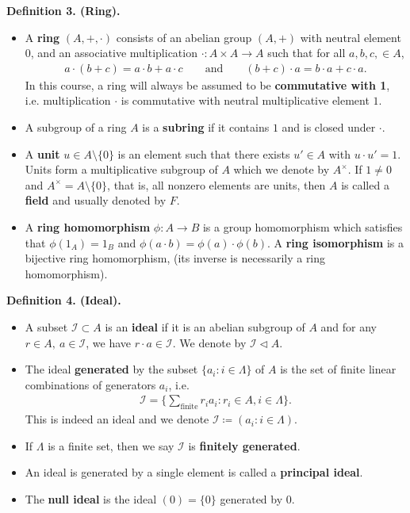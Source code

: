\documentclass[12pt,a4paper,footinclude=true,headinclude=true]{scrbook} %
\newenvironment{definition}[2][Definition]
    { \begin{mdframed}[backgroundcolor=gray!20] \textbf{#1 #2.}\ }
    {  \end{mdframed}}
\begin{document}
\begin{definition}{3. (Ring)}
    \begin{itemize}
        \item[(a)] A \textbf{ring} $(A,+,\cdot)$ consists of an abelian group $(A,+)$ with neutral element $0$, and an associative multiplication $\cdot:A\times A\to A$ such that for all $a,b,c,\in A$,
        \begin{align*}
            a\cdot(b+c)=a\cdot b+a\cdot c\qquad\text{and}\qquad (b+c)\cdot a=b\cdot a+c\cdot a.
        \end{align*}
        In this course, a ring will always be assumed to be \textbf{commutative with 1}, i.e. multiplication $\cdot$ is commutative with neutral multiplicative element $1$.
        \item[(b)] A subgroup of a ring $A$ is a \textbf{subring} if it contains $1$ and is closed under $\cdot$.
        \item[(c)] A \textbf{unit} $u\in A\setminus\{0\}$ is an element such that there exists $u'\in A$ with $u\cdot u'=1$. \\ Units form a multiplicative subgroup of $A$ which we denote by $A^\times$. If $1\neq0$ and $A^\times=A\setminus\{0\}$, that is, all nonzero elements are units, then $A$ is called a \textbf{field} and usually denoted by $F$.
        \item[(d)] A \textbf{ring homomorphism} $\phi:A\to B$ is a group homomorphism which satisfies that $\phi(1_A)=1_B$ and $\phi(a\cdot b)=\phi(a) \cdot\phi(b)$. A \textbf{ring isomorphism} is a bijective ring homomorphism, (its inverse is necessarily a ring homomorphism).
    \end{itemize}
\end{definition}

\begin{definition}{4. (Ideal)}
    \begin{itemize}
        \item[(a)] A subset $\mathcal{I}\subset A$ is an \textbf{ideal} if it is an abelian subgroup of $A$ and for any $r\in A,\ a\in\mathcal{I}$, we have $r\cdot a\in\mathcal{I}$. We denote by $\mathcal{I}\triangleleft A$.
        \item[(b)] The ideal \textbf{generated} by the subset $\{a_i:i\in \Lambda\}$ of $A$ is the set of finite linear combinations of generators $a_i$, i.e. 
        \begin{align*}
            \mathcal{I}=\{\sum_{\text{finite}}r_ia_i:r_i\in A, i\in\Lambda\}.
        \end{align*}
        This is indeed an ideal and we denote $\mathcal{I}\coloneqq (a_i: i\in\Lambda)$.
        \item[(c)] If $\Lambda$ is a finite set, then we say $\mathcal{I}$ is \textbf{finitely generated}. 
        \item[(d)] An ideal is generated by a single element is called a \textbf{principal ideal}.
        \item[(e)] The \textbf{null ideal} is the ideal $(0)=\{0\}$ generated by $0$.
    \end{itemize}
\end{definition}
\end{document}
